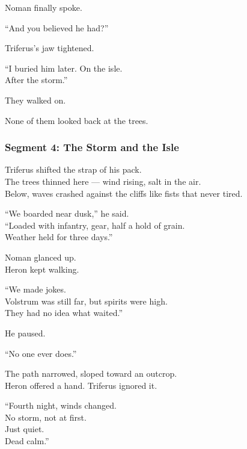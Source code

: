 \documentclass[9pt]{article}
\begin{document}
\vspace{1em}

Noman finally spoke.

“And you believed he had?”

Triferus’s jaw tightened.

“I buried him later. On the isle.\\
After the storm.”

\vspace{1em}

They walked on.

None of them looked back at the trees.

\newpage

\subsubsection*{Segment 4: The Storm and the Isle}

Triferus shifted the strap of his pack.\\
The trees thinned here — wind rising, salt in the air.\\
Below, waves crashed against the cliffs like fists that never tired.

“We boarded near dusk,” he said.\\
“Loaded with infantry, gear, half a hold of grain.\\
Weather held for three days.”

\vspace{1em}

Noman glanced up.\\
Heron kept walking.

“We made jokes.\\
Volstrum was still far, but spirits were high.\\
They had no idea what waited.”

He paused.

“No one ever does.”

\vspace{1em}

The path narrowed, sloped toward an outcrop.\\
Heron offered a hand. Triferus ignored it.

“Fourth night, winds changed.\\
No storm, not at first.\\
Just quiet.\\
Dead calm.”

\vspace{1em}
\end{document}
